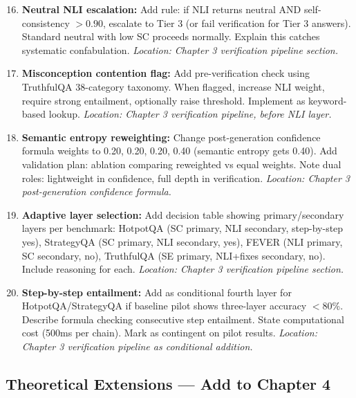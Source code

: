 \documentclass[11pt,a4paper]{article}
\begin{document}
\begin{enumerate}
\setcounter{enumi}{15}
\item \textbf{Neutral NLI escalation:} Add rule: if NLI returns neutral AND self-consistency $> 0.90$, escalate to Tier 3 (or fail verification for Tier 3 answers). Standard neutral with low SC proceeds normally. Explain this catches systematic confabulation. \textit{Location: Chapter 3 verification pipeline section.}

\item \textbf{Misconception contention flag:} Add pre-verification check using TruthfulQA 38-category taxonomy. When flagged, increase NLI weight, require strong entailment, optionally raise threshold. Implement as keyword-based lookup. \textit{Location: Chapter 3 verification pipeline, before NLI layer.}

\item \textbf{Semantic entropy reweighting:} Change post-generation confidence formula weights to 0.20, 0.20, 0.20, 0.40 (semantic entropy gets 0.40). Add validation plan: ablation comparing reweighted vs equal weights. Note dual roles: lightweight in confidence, full depth in verification. \textit{Location: Chapter 3 post-generation confidence formula.}

\item \textbf{Adaptive layer selection:} Add decision table showing primary/secondary layers per benchmark: HotpotQA (SC primary, NLI secondary, step-by-step yes), StrategyQA (SC primary, NLI secondary, yes), FEVER (NLI primary, SC secondary, no), TruthfulQA (SE primary, NLI+fixes secondary, no). Include reasoning for each. \textit{Location: Chapter 3 verification pipeline section.}

\item \textbf{Step-by-step entailment:} Add as conditional fourth layer for HotpotQA/StrategyQA if baseline pilot shows three-layer accuracy $<80$\%. Describe formula checking consecutive step entailment. State computational cost (500ms per chain). Mark as contingent on pilot results. \textit{Location: Chapter 3 verification pipeline as conditional addition.}
\end{enumerate}

\subsection{Theoretical Extensions — Add to Chapter 4}
\end{document}
